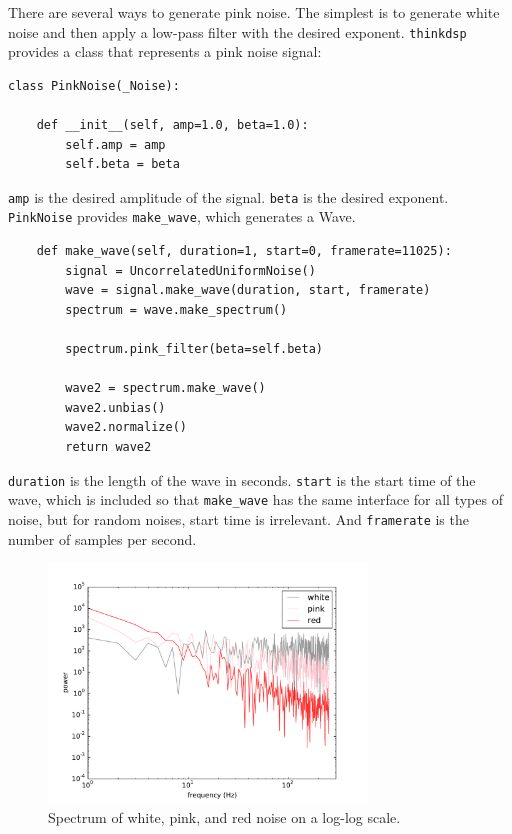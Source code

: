 \documentclass[12pt]{book}
\begin{document}
There are several ways to generate pink noise.  The simplest is to
generate white noise and then apply a low-pass filter with the
desired exponent.  {\tt thinkdsp} provides a class that represents
a pink noise signal:

\begin{verbatim}
class PinkNoise(_Noise):

    def __init__(self, amp=1.0, beta=1.0):
        self.amp = amp
        self.beta = beta
\end{verbatim}

{\tt amp} is the desired amplitude of the signal.
{\tt beta} is the desired exponent.  {\tt PinkNoise} provides
\verb"make_wave", which generates a Wave.

\begin{verbatim}
    def make_wave(self, duration=1, start=0, framerate=11025):
        signal = UncorrelatedUniformNoise()
        wave = signal.make_wave(duration, start, framerate)
        spectrum = wave.make_spectrum()

        spectrum.pink_filter(beta=self.beta)

        wave2 = spectrum.make_wave()
        wave2.unbias()
        wave2.normalize()
        return wave2
\end{verbatim}

{\tt duration} is the length of the wave in seconds.  {\tt start} is
the start time of the wave, which is included so that \verb"make_wave"
has the same interface for all types of noise, but for random noises,
start time is irrelevant.  And {\tt framerate} is the number of
samples per second.

\begin{figure}
\centerline{\includegraphics[height=2.5in]{figs/noise-triple.pdf}}
\caption{Spectrum of white, pink, and red noise on a log-log scale.}
\label{fig.noise-triple}
\end{figure}
\end{document}
